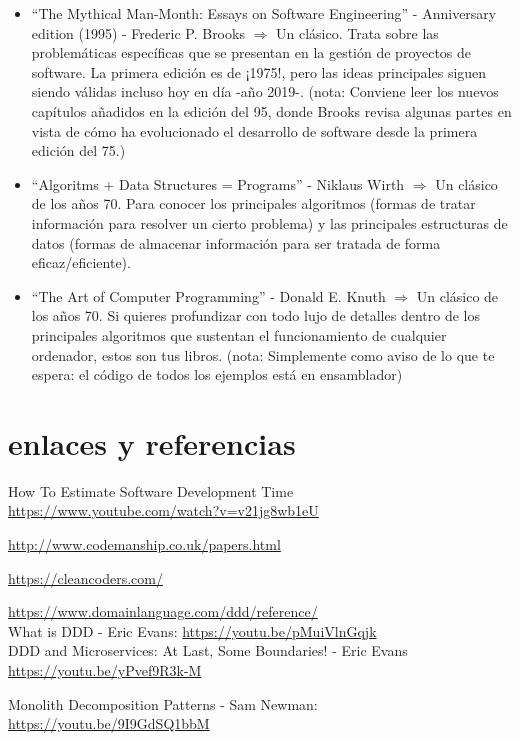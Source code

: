 \documentclass[spanish,12pt,a4paper,final,oneside]{book}
\begin{document}
\begin{itemize}
\item ``The Mythical Man-Month: Essays on Software Engineering'' - Anniversary edition (1995) - Frederic P. Brooks $\Rightarrow$ Un clásico. Trata sobre las problemáticas específicas que se presentan en la gestión de proyectos de software. La primera edición es de ¡1975!, pero las ideas principales siguen siendo válidas incluso hoy en día -año 2019-. (nota: Conviene leer los nuevos capítulos añadidos en la edición del 95, donde Brooks revisa algunas partes en vista de cómo ha evolucionado el desarrollo de software desde la primera edición del 75.)

\item ``Algoritms + Data Structures = Programs'' - Niklaus Wirth  $\Rightarrow$ Un clásico de los años 70. Para conocer los principales algoritmos (formas de tratar información para resolver un cierto problema) y las principales estructuras de datos (formas de almacenar información para ser tratada de forma eficaz/eficiente).

\item ``The Art of Computer Programming'' - Donald E. Knuth  $\Rightarrow$ Un clásico de los años 70. Si quieres profundizar con todo lujo de detalles dentro de los principales algoritmos que sustentan el funcionamiento de cualquier ordenador, estos son tus libros. (nota: Simplemente como aviso de lo que te espera: el código de todos los ejemplos está en ensamblador)

\end{itemize}

\section{enlaces y referencias}

How To Estimate Software Development Time
\\ \url{https://www.youtube.com/watch?v=v21jg8wb1eU}

\url{http://www.codemanship.co.uk/papers.html}

\url{https://cleancoders.com/}

\url{https://www.domainlanguage.com/ddd/reference/}
\\What is DDD - Eric Evans: \url{https://youtu.be/pMuiVlnGqjk}
\\DDD and Microservices: At Last, Some Boundaries! - Eric Evans
\\ \url{https://youtu.be/yPvef9R3k-M}

Monolith Decomposition Patterns - Sam Newman: \url{https://youtu.be/9I9GdSQ1bbM}
\end{document}
